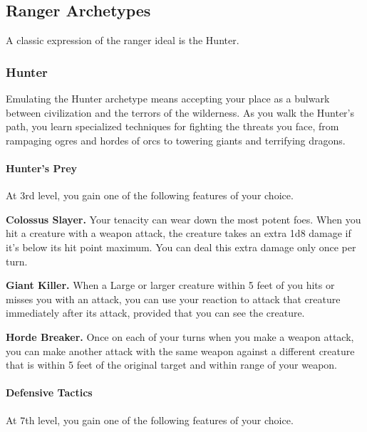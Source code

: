 \documentclass[
]{article}
\begin{document}
\hypertarget{ranger-archetypes}{%
\subsection{Ranger Archetypes}\label{ranger-archetypes}}

A classic expression of the ranger ideal is the Hunter.

\hypertarget{hunter}{%
\subsubsection{Hunter}\label{hunter}}

Emulating the Hunter archetype means accepting your place as a bulwark
between civilization and the terrors of the wilderness. As you walk the
Hunter's path, you learn specialized techniques for fighting the threats
you face, from rampaging ogres and hordes of orcs to towering giants and
terrifying dragons.

\hypertarget{hunters-prey}{%
\paragraph{Hunter's Prey}\label{hunters-prey}}

At 3rd level, you gain one of the following features of your choice.

\textbf{Colossus Slayer.} Your tenacity can wear down the most potent
foes. When you hit a creature with a weapon attack, the creature takes
an extra 1d8 damage if it's below its hit point maximum. You can deal
this extra damage only once per turn.

\textbf{Giant Killer.} When a Large or larger creature within 5 feet of
you hits or misses you with an attack, you can use your reaction to
attack that creature immediately after its attack, provided that you can
see the creature.

\textbf{Horde Breaker.} Once on each of your turns when you make a
weapon attack, you can make another attack with the same weapon against
a different creature that is within 5 feet of the original target and
within range of your weapon.

\hypertarget{defensive-tactics}{%
\paragraph{Defensive Tactics}\label{defensive-tactics}}

At 7th level, you gain one of the following features of your choice.
\end{document}
